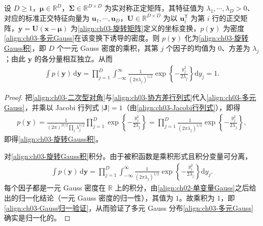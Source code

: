 \documentclass[../../main.tex]{subfiles}
\begin{document}
\begin{proposition}\label{proposition:ch03-旋转Gauss}
设 $D\geqslant1$，$\boldsymbol{\mu}\in\mathbb{R}^{D}$，$\boldsymbol{\Sigma}\in\mathbb{R}^{D\times D}$ 为实对称正定矩阵，其特征值为 $\lambda_1,\cdots,\lambda_D>0$、对应的标准正交特征向量为 $\boldsymbol{u}_1,\cdots,\boldsymbol{u}_D$，$\boldsymbol{U}\in\mathbb{R}^{D\times D}$ 为以 $\boldsymbol{u}_i^{\mathsf{T}}$ 为第 $i$ 行的正交矩阵，$\boldsymbol{y}=\boldsymbol{U}(\boldsymbol{x}-\boldsymbol{\mu})$ 为\eqref{align:ch03-旋转矩阵}定义的坐标变换，$p(\boldsymbol{y})$ 为密度\eqref{align:ch03-多元Gauss}在该变换下诱导的密度。则 $p(\boldsymbol{y})$ 化为\eqref{align:ch03-旋转Gauss积}，即 $D$ 个一元 Gauss 密度的乘积，其第 $j$ 个因子的均值为 $0$、方差为 $\lambda_j$；由此 $\boldsymbol{y}$ 的各分量相互独立。从而
\begin{align}
\int p(\boldsymbol{y})\,\mathrm{d}\boldsymbol{y}=\prod_{j=1}^{D}\int_{-\infty}^{\infty}\frac{1}{(2\pi\lambda_{j})^{1/2}}\exp\left\{-\frac{y_{j}^{2}}{2\lambda_{j}}\right\}\mathrm{d}y_{j}=1.
\label{align:ch03-Gauss归一验证}
\end{align}
\end{proposition}
\begin{proof}
把\eqref{align:ch03-二次型对角}与\eqref{align:ch03-协方差行列式}代入\eqref{align:ch03-多元Gauss}，并乘以 Jacobi 行列式 $\lvert\boldsymbol{J}\rvert=1$（由\eqref{align:ch03-Jacobi行列式}），即得
\begin{align*}
p(\boldsymbol{y})=\frac{1}{(2\pi)^{D/2}\prod_j\lambda_j^{1/2}}\prod_{j=1}^{D}\exp\left\{-\frac{y_j^{2}}{2\lambda_j}\right\}=\prod_{j=1}^{D}\frac{1}{(2\pi\lambda_j)^{1/2}}\exp\left\{-\frac{y_j^{2}}{2\lambda_j}\right\},
\end{align*}
即得\eqref{align:ch03-旋转Gauss积}。

对\eqref{align:ch03-旋转Gauss积}积分。由于被积函数是乘积形式且积分变量可分离，
\begin{align*}
\int p(\boldsymbol{y})\,\mathrm{d}\boldsymbol{y}=\prod_{j=1}^{D}\int_{-\infty}^{\infty}\frac{1}{(2\pi\lambda_j)^{1/2}}\exp\left\{-\frac{y_j^{2}}{2\lambda_j}\right\}\mathrm{d}y_j.
\end{align*}
每个因子都是一元 Gauss 密度在 $\mathbb{R}$ 上的积分，由\cref{align:ch02-单变量Gauss}之后给出的归一化结论（一元 Gauss 密度的归一性），其值为 $1$。故乘积为 $1$，即\eqref{align:ch03-Gauss归一验证}，从而验证了多元 Gauss 分布\eqref{align:ch03-多元Gauss}确实是归一化的。
\end{proof}
\end{document}
